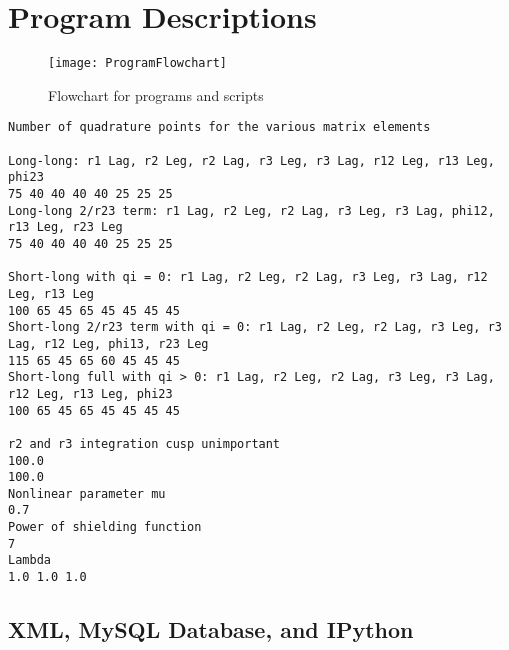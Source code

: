 \documentclass[Dissertation.tex]{subfiles}
\begin{document}
\chapter{Program Descriptions}
\label{chp:Programs}





\begin{figure}
	\centering
	\texttt{[image: ProgramFlowchart]}
	\caption{Flowchart for programs and scripts}
	\label{fig:ProgramFlowchart}
\end{figure}


{
\singlespacing

\begin{lstlisting}[caption=Set of integration points in m07n7.txt]
Number of quadrature points for the various matrix elements

Long-long: r1 Lag, r2 Leg, r2 Lag, r3 Leg, r3 Lag, r12 Leg, r13 Leg, phi23
75 40 40 40 40 25 25 25
Long-long 2/r23 term: r1 Lag, r2 Leg, r2 Lag, r3 Leg, r3 Lag, phi12, r13 Leg, r23 Leg
75 40 40 40 40 25 25 25

Short-long with qi = 0: r1 Lag, r2 Leg, r2 Lag, r3 Leg, r3 Lag, r12 Leg, r13 Leg
100 65 45 65 45 45 45 45
Short-long 2/r23 term with qi = 0: r1 Lag, r2 Leg, r2 Lag, r3 Leg, r3 Lag, r12 Leg, phi13, r23 Leg
115 65 45 65 60 45 45 45
Short-long full with qi > 0: r1 Lag, r2 Leg, r2 Lag, r3 Leg, r3 Lag, r12 Leg, r13 Leg, phi23
100 65 45 65 45 45 45 45

r2 and r3 integration cusp unimportant
100.0
100.0
Nonlinear parameter mu
0.7
Power of shielding function
7
Lambda
1.0 1.0 1.0
\end{lstlisting}

}



\section{XML, MySQL Database, and IPython}
\label{sec:XMLSQLIPy}

\end{document}

